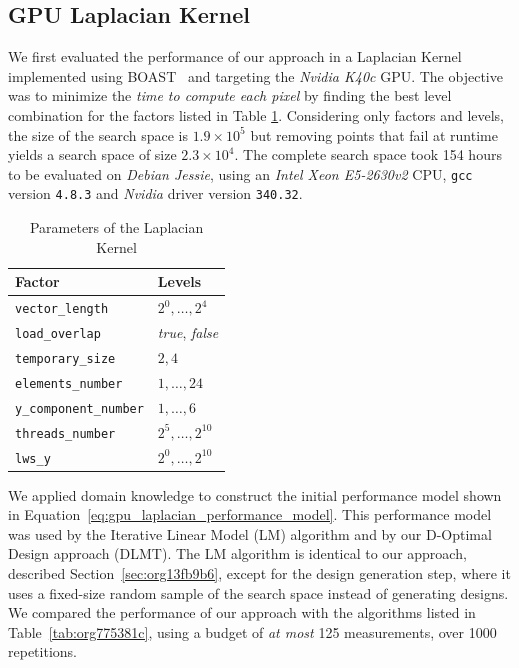 \documentclass[conference]{IEEEtran}
\begin{document}
\subsection{GPU Laplacian Kernel}
\label{sec:orgf2ee1ae}
We first evaluated the performance of our approach in a Laplacian Kernel
implemented using BOAST~\cite{videau2017boast} and targeting the \emph{Nvidia
K40c} GPU. The objective was to minimize the \emph{time to compute each pixel} by
finding the best level combination for the factors listed in Table
\ref{tab:org6f5f6f8}. Considering only factors and levels, the size of the
search space is \(1.9\times10^5\) but removing points that fail at runtime yields
a search space of size \(2.3\times10^4\). The complete search space took 154 hours
to be evaluated on \emph{Debian Jessie}, using an \emph{Intel Xeon E5-2630v2} CPU,
\texttt{gcc} version \texttt{4.8.3} and \emph{Nvidia} driver version \texttt{340.32}.

\begin{table}[ht]
\caption{\label{tab:org6f5f6f8}
Parameters of the Laplacian Kernel}
\centering
\footnotesize
\begin{tabular}{ll}
\toprule
Factor & Levels\\
\midrule
\texttt{vector\_length} & \(2^0,\dots,2^4\)\\
\texttt{load\_overlap} & \textit{true}, \textit{false}\\
\texttt{temporary\_size} & \(2,4\)\\
\texttt{elements\_number} & \(1,\dots,24\)\\
\texttt{y\_component\_number} & \(1,\dots,6\)\\
\texttt{threads\_number} & \(2^5,\dots,2^{10}\)\\
\texttt{lws\_y} & \(2^0,\dots,2^{10}\)\\
\bottomrule
\end{tabular}
\end{table}

We applied domain knowledge to construct the initial performance model shown in
Equation~\eqref{eq:gpu_laplacian_performance_model}. This performance model
was used by the Iterative Linear Model (LM) algorithm and by our D-Optimal
Design approach (DLMT). The LM algorithm is identical to our approach, described
Section~\ref{sec:org13fb9b6}, except for the design
generation step, where it uses a fixed-size random sample of the search space
instead of generating designs. We compared the performance of our approach with
the algorithms listed in Table~\ref{tab:org775381c}, using a
budget of \emph{at most} 125 measurements, over 1000 repetitions.
\end{document}
